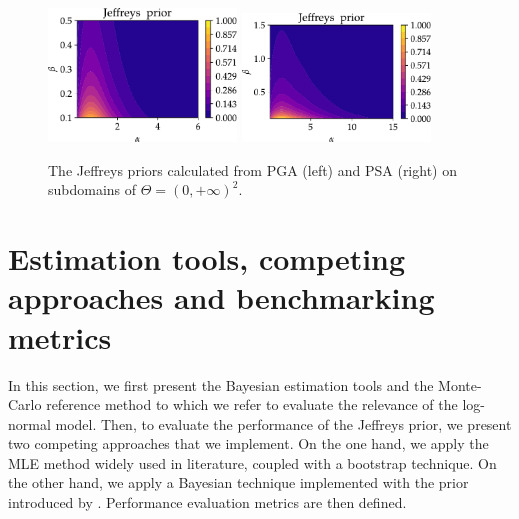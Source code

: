        \begin{figure}[!ht]
            \centering
            {\includegraphics[width=5cm]{figures/PREM/Jeff_prior_PGA-2.pdf}}\hspace*{0.5cm}
            {\includegraphics[width=5cm]{figures/PREM/Jeff_prior_PSA-1.pdf}}
            \caption{The Jeffreys priors calculated from PGA (left) and PSA (right) on subdomains of $\Theta=(0,+\infty)^2$.}
             \label{uncIM:fig:jeff_prior}
        \end{figure}

\section{Estimation tools, competing approaches and benchmarking metrics} \label{uncIM:sec:tools}

    In this section, we first present the Bayesian estimation tools and the Monte-Carlo reference method to which we refer to evaluate the relevance of the log-normal model. Then, to evaluate the performance of the Jeffreys prior, we present two competing approaches that we implement. On the one hand, we apply the MLE method widely used in literature, coupled with a bootstrap technique. On the other hand, we apply a Bayesian technique implemented with the prior introduced by \citet{straub_improved_2008}. Performance evaluation metrics are then defined.

